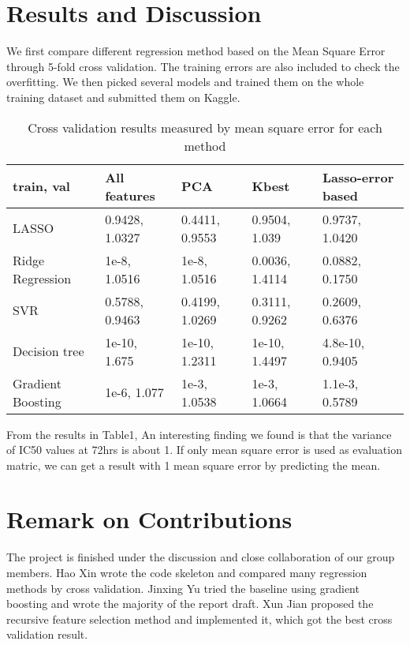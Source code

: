 \documentclass{article}
\begin{document}
\section{Results and Discussion}
We first compare different regression method based on the Mean Square Error through 5-fold cross validation. The training errors are also included to check the overfitting. We then picked several models and trained them on the whole training dataset and submitted them on Kaggle.
\begin{table}[htbp]
\centering
\begin{tabular}{|l|l|l|l|l|}
\hline
train, val &  All features &  PCA  & Kbest & Lasso-error based\\
\hline
LASSO & 0.9428, 1.0327 & 0.4411, 0.9553 & 0.9504, 1.039 & 0.9737, 1.0420\\
\hline
Ridge Regression & 1e-8, 1.0516 & 1e-8, 1.0516 & 0.0036, 1.4114 & 0.0882, 0.1750\\
\hline
SVR & 0.5788, 0.9463 & 0.4199, 1.0269 & 0.3111, 0.9262  & 0.2609, 0.6376\\
\hline
Decision tree & 1e-10, 1.675 & 1e-10, 1.2311 & 1e-10, 1.4497 & 4.8e-10, 0.9405\\
\hline
Gradient Boosting & 1e-6, 1.077 & 1e-3, 1.0538 & 1e-3, 1.0664 & 1.1e-3, 0.5789\\
\hline
\end{tabular}
\caption{Cross validation results measured by mean square error for each method}
\end{table}
From the results in Table1, 
An interesting finding we found is that the variance of IC50 values at 72hrs is about 1. If only mean square error is used as evaluation matric, we can get a result with 1 mean square error by predicting the mean.

\section{Remark on Contributions}
The project is finished under the discussion and close collaboration of our group members. Hao Xin wrote the code skeleton and compared many regression methods by cross validation. Jinxing Yu tried the baseline using gradient boosting and wrote the majority of the report draft. Xun Jian proposed the recursive feature selection method and implemented it, which got the best cross validation result.

\end{document}
